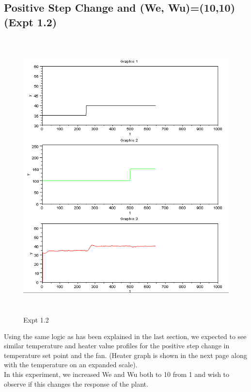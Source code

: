 \subsection{Positive Step Change and (We, Wu)=(10,10) (Expt 1.2)}
\begin{figure}[H]
  \includegraphics[width=12cm, height=15cm]{mpc/1_2.png}
  \caption{Expt 1.2}
\end{figure}
Using the same logic as has been explained in the last section, we expected to see similar temperature and heater value profiles for the positive step change in temperature set point and the fan. (Heater graph is shown in the next page along with the temperature on an expanded scale). \\
In this experiment, we increased We and Wu both to 10 from 1 and wish to observe if this changes the response of the plant.
